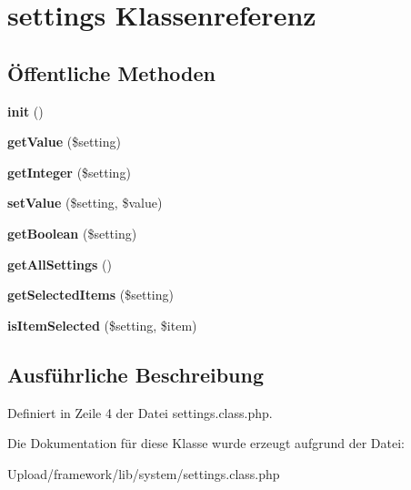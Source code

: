 \hypertarget{classsettings}{}\section{settings Klassenreferenz}
\label{classsettings}
\subsection*{Öffentliche Methoden}
\begin{DoxyCompactItemize}
\item 
\mbox{\label{classsettings_a6387cb1347b13bc74bf1cfc211d5c47b}} 
{\bfseries init} ()
\item 
\mbox{\label{classsettings_aedd9dbb7f6be7253cc046944651f6c54}} 
{\bfseries get\+Value} (\$setting)
\item 
\mbox{\label{classsettings_a2fd458b3b308a52b118f3d67a6f76a7d}} 
{\bfseries get\+Integer} (\$setting)
\item 
\mbox{\label{classsettings_a2716ffbbac45dc41c260d1d020d7196b}} 
{\bfseries set\+Value} (\$setting, \$value)
\item 
\mbox{\label{classsettings_a0b67609135bef50b21874c4538619193}} 
{\bfseries get\+Boolean} (\$setting)
\item 
\mbox{\label{classsettings_a50ce0d9db2a9453329e6f6501b0bc9a9}} 
{\bfseries get\+All\+Settings} ()
\item 
\mbox{\label{classsettings_a25ef2bd9d675423de23d21ed95676e1b}} 
{\bfseries get\+Selected\+Items} (\$setting)
\item 
\mbox{\label{classsettings_a8f94183558bd2d811bb84bda402459c8}} 
{\bfseries is\+Item\+Selected} (\$setting, \$item)
\end{DoxyCompactItemize}


\subsection{Ausführliche Beschreibung}


Definiert in Zeile 4 der Datei settings.\+class.\+php.



Die Dokumentation für diese Klasse wurde erzeugt aufgrund der Datei\+:\begin{DoxyCompactItemize}
\item 
Upload/framework/lib/system/settings.\+class.\+php\end{DoxyCompactItemize}
